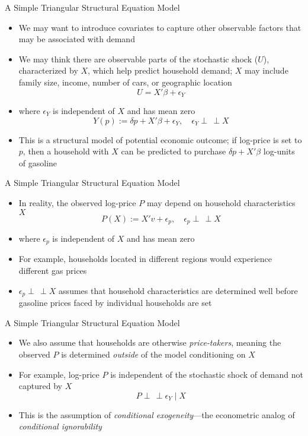 \documentclass[aspectratio=1610,12pt,xcolor=dvipsnames]{beamer}
\newcommand{\indep}{\perp\!\!\!\, \perp}
\begin{document}
\begin{frame}{A Simple Triangular Structural Equation Model}

\begin{itemize}
    \item We may want to introduce covariates to capture other observable factors that may be associated with demand
    \item We may think there are observable parts of the stochastic shock ($U$), characterized by $X$, which help predict household demand; $X$ may include family size, income, number of cars, or geographic location
    \[U = X'\beta + \epsilon_Y\]
    \item where $\epsilon_Y$ is independent of $X$ and has mean zero
    \[Y(p) := \delta p + X'\beta + \epsilon_Y , \quad \epsilon_Y \indep X \]
    \item This is a structural model of potential economic outcome; if log-price is set to $p$, then a household with $X$ can be predicted to purchase 
    $\delta p + X' \beta$ log-units of gasoline
\end{itemize}
\end{frame}

\begin{frame}{A Simple Triangular Structural Equation Model}

\begin{itemize}
    \item In reality, the observed log-price $P$ may depend on household characteristics $X$
    \[P(X) := X'v + \epsilon_p, \quad \epsilon_p \indep X \]
    \item where $\epsilon_p$ is independent of $X$ and has mean zero
    \item For example, households located in different regions would experience different gas prices
    \item $\epsilon_p \indep X$ assumes that household characteristics are determined well before gasoline prices faced by individual households are set
\end{itemize}
\end{frame}

\begin{frame}{A Simple Triangular Structural Equation Model}
    \begin{itemize}
        \item We also assume that households are otherwise \textit{price-takers}, meaning the observed $P$ is determined \textit{outside} of the model conditioning on $X$
        \item For example, log-price $P$ is independent of the stochastic shock of demand not captured by $X$
        \[P \indep \epsilon_Y \mid X \]
        \item This is the assumption of \textit{conditional exogeneity}—the econometric analog of \textit{conditional ignorability}
    \end{itemize}
\end{frame}
\end{document}

